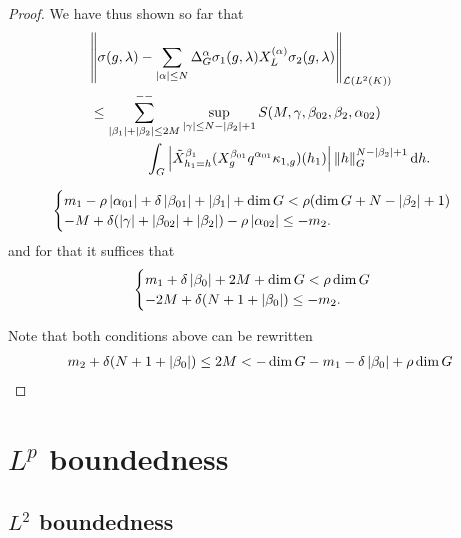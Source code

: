 \begin{proof}
    We have thus shown so far that
    \begin{align*}
        &\norm [\Lin {\Lebesgue 2 \CompactGroup}] {\sigma(g, \lambda) - \sum_{\abs \alpha \leq N} \DifferenceOperatorOrder \alpha \sigma_1(g, \lambda) \TaylorLeftDifferentialOperator \alpha \sigma_2(g, \lambda)}\\
        &\leq
        \lcsum{\abs {\beta_1} + \abs {\beta_2} \leq 2M}
        \sup_{\abs \gamma \leq N - \abs {\beta_2} + 1}
        S(M, \gamma, \beta_{02}, \beta_2, \alpha_{02})\\
        &\qquad \qquad
        \int_\Group \abs {\RightDifferentialOperator[h_1 = h] {\beta_1} (\LeftDifferentialOperator [g] {\beta_{01}} q^{\alpha_{01}} \kappa_{1, g})(h_1)} \norm [\Group] h^{N - \abs {\beta_2} + 1} \dd h.
    \end{align*}

    \begin{align*}
        \begin{cases}
            m_1 - \rho \left|{\alpha_{01}}\right| + \delta \left|{\beta_{01}}\right| + \left|{\beta_1}\right| + \dim G < \rho (\dim G + N - \left|{\beta_2}\right| + 1)\\
            -M + \delta(\left|{\gamma}\right| + \left|{\beta_{02}}\right| + \left|{\beta_2}\right|) - \rho \left|{\alpha_{02}}\right| \leq -m_2.
        \end{cases}
    \end{align*}
    and for that it suffices that
    \begin{align*}
        \begin{cases}
            m_1 + \delta \left|{\beta_{0}}\right| + 2 M + \dim G < \rho \dim G\\
            -2M + \delta(N + 1 + \left|{\beta_{0}}\right|) \leq -m_2.
        \end{cases}
    \end{align*}

    Note that both conditions above can be rewritten
    \begin{align*}
        m_2 + \delta(N + 1 + \left|{\beta_0}\right|)
        \leq 2M <
        -\dim G - m_1 - \delta \left|{\beta_0}\right| + \rho \dim G
    \end{align*}
\end{proof}

\section{\texorpdfstring{$L^p$}{Lp} boundedness}

\subsection{\texorpdfstring{$L^2$}{L2} boundedness}

